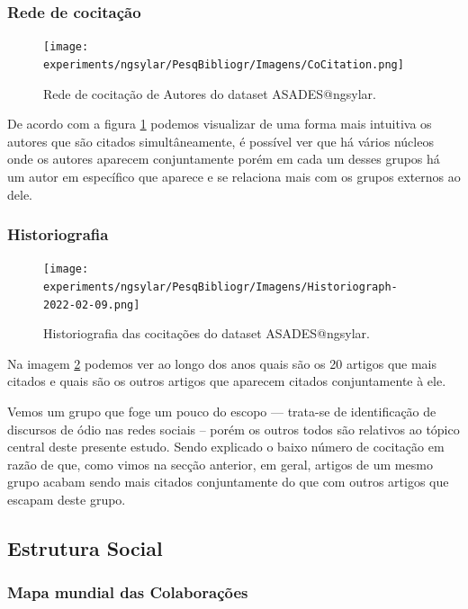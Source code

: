\subsubsection{Rede de cocitação}

\begin{figure}[H]
    \centering
\texttt{[image: experiments/ngsylar/PesqBibliogr/Imagens/CoCitation.png]}
    \caption{Rede de cocitação de Autores do dataset ASADES@ngsylar.}
    \label{fig:ASADES@ngsylar:Cocitation}
\end{figure}

De acordo com a figura \ref{fig:ASADES@ngsylar:Cocitation} podemos visualizar de uma forma mais intuitiva os autores que são citados simultâneamente, é possível ver que há vários núcleos onde os autores aparecem conjuntamente porém em cada um desses grupos há um autor em específico que aparece e se relaciona mais com os grupos externos ao dele.

\subsubsection{Historiografia}
\begin{figure}[H]
    \centering
\texttt{[image: experiments/ngsylar/PesqBibliogr/Imagens/Historiograph-2022-02-09.png]}
    \caption{Historiografia das cocitações do dataset ASADES@ngsylar.}
    \label{fig:ASADES@ngsylar:Historiograph}
\end{figure}

Na imagem \ref{fig:ASADES@ngsylar:Historiograph} podemos ver ao longo dos anos quais são os 20 artigos que mais citados e quais são os outros artigos que aparecem citados  conjuntamente à ele. 

Vemos um grupo que foge um pouco do escopo --- trata-se de identificação de discursos de ódio nas redes sociais -- porém os outros todos são relativos ao tópico central deste presente estudo. Sendo explicado o baixo número de cocitação em razão de que, como vimos na secção anterior, em geral, artigos de um mesmo grupo acabam sendo mais citados conjuntamente do que com outros artigos que escapam deste grupo.


\subsection{Estrutura Social}

\subsubsection{Mapa mundial das Colaborações}

